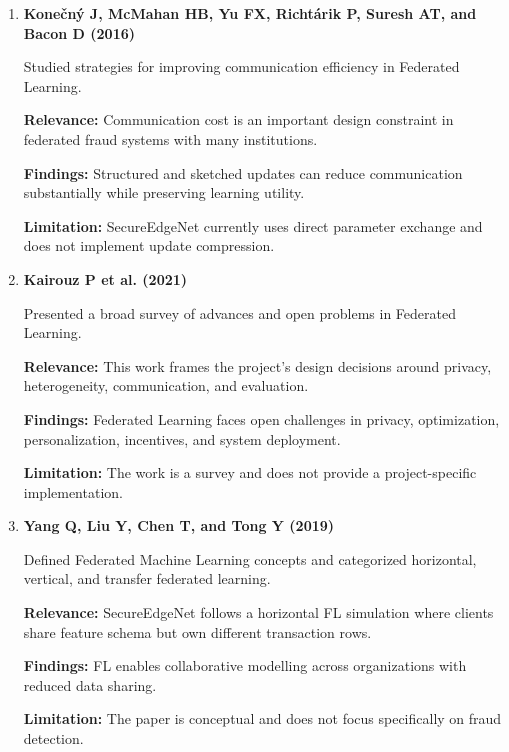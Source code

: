 \begin{enumerate}
    \textbf{Findings:} FedAvg can reduce communication by allowing clients to perform multiple local updates before server aggregation.

    \textbf{Limitation:} FedAvg can struggle under highly non-IID client data and does not solve privacy leakage by itself.

    \item \textbf{Kone\v{c}n\'y J, McMahan HB, Yu FX, Richt\'arik P, Suresh AT, and Bacon D (2016) \cite{ref13}}

    Studied strategies for improving communication efficiency in Federated Learning.

    \textbf{Relevance:} Communication cost is an important design constraint in federated fraud systems with many institutions.

    \textbf{Findings:} Structured and sketched updates can reduce communication substantially while preserving learning utility.

    \textbf{Limitation:} SecureEdgeNet currently uses direct parameter exchange and does not implement update compression.

    \item \textbf{Kairouz P et al. (2021) \cite{ref14}}

    Presented a broad survey of advances and open problems in Federated Learning.

    \textbf{Relevance:} This work frames the project's design decisions around privacy, heterogeneity, communication, and evaluation.

    \textbf{Findings:} Federated Learning faces open challenges in privacy, optimization, personalization, incentives, and system deployment.

    \textbf{Limitation:} The work is a survey and does not provide a project-specific implementation.

    \item \textbf{Yang Q, Liu Y, Chen T, and Tong Y (2019) \cite{ref15}}

    Defined Federated Machine Learning concepts and categorized horizontal, vertical, and transfer federated learning.

    \textbf{Relevance:} SecureEdgeNet follows a horizontal FL simulation where clients share feature schema but own different transaction rows.

    \textbf{Findings:} FL enables collaborative modelling across organizations with reduced data sharing.

    \textbf{Limitation:} The paper is conceptual and does not focus specifically on fraud detection.


\end{enumerate}
